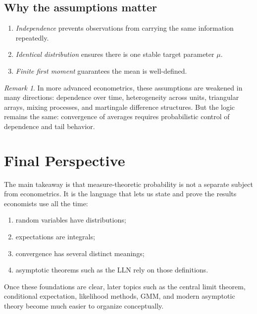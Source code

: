 \documentclass[11pt]{article}
\theoremstyle{remark}
\newtheorem{remark}{Remark}[section]
\newcommand{\1}{\mathbbm{1}}
\begin{document}
\subsection{Why the assumptions matter}

\begin{enumerate}[label=(\alph*)]
  \item \emph{Independence} prevents observations from carrying the same information repeatedly.
  \item \emph{Identical distribution} ensures there is one stable target parameter \(\mu\).
  \item \emph{Finite first moment} guarantees the mean is well-defined.
\end{enumerate}

\begin{remark}
In more advanced econometrics, these assumptions are weakened in many directions: dependence over time, heterogeneity across units, triangular arrays, mixing processes, and martingale difference structures. But the logic remains the same: convergence of averages requires probabilistic control of dependence and tail behavior.
\end{remark}

\section{Final Perspective}

The main takeaway is that measure-theoretic probability is not a separate subject from econometrics. It is the language that lets us state and prove the results economists use all the time:

\begin{enumerate}[label=(\roman*)]
  \item random variables have distributions;
  \item expectations are integrals;
  \item convergence has several distinct meanings;
  \item asymptotic theorems such as the LLN rely on those definitions.
\end{enumerate}

Once these foundations are clear, later topics such as the central limit theorem, conditional expectation, likelihood methods, GMM, and modern asymptotic theory become much easier to organize conceptually.
\end{document}
